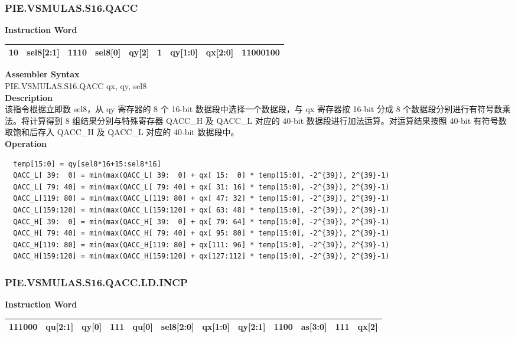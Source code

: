 \newpage
\subsubsection{PIE.VSMULAS.S16.QACC}\label{instruction:PIEVSMULASS16QACC}
\setlength\tabcolsep{6pt}
\textbf{Instruction Word} \\
\begin{tabular}{|c|c|c|c|c|c|c|c|c|}
	\hline
	10 & sel8[2:1] & 1110 & sel8[0] & qy[2] & 1 & qy[1:0] & qx[2:0] & 11000100 \\
	\hline
\end{tabular}

\textbf{Assembler Syntax} \\
PIE.VSMULAS.S16.QACC qx, qy, sel8 \\
\textbf{Description} \\
该指令根据立即数 sel8，从 qy 寄存器的 8 个 16-bit 数据段中选择一个数据段，与 qx 寄存器按 16-bit 分成 8 个数据段分别进行有符号数乘法。将计算得到 8 组结果分别与特殊寄存器 QACC\_H 及 QACC\_L 对应的 40-bit 数据段进行加法运算。对运算结果按照 40-bit 有符号数取饱和后存入 QACC\_H 及 QACC\_L 对应的 40-bit 数据段中。\\
\textbf{Operation}
\begin{lstlisting}
  temp[15:0] = qy[sel8*16+15:sel8*16]
  QACC_L[ 39:  0] = min(max(QACC_L[ 39:  0] + qx[ 15:  0] * temp[15:0], -2^{39}), 2^{39}-1)
  QACC_L[ 79: 40] = min(max(QACC_L[ 79: 40] + qx[ 31: 16] * temp[15:0], -2^{39}), 2^{39}-1)
  QACC_L[119: 80] = min(max(QACC_L[119: 80] + qx[ 47: 32] * temp[15:0], -2^{39}), 2^{39}-1)
  QACC_L[159:120] = min(max(QACC_L[159:120] + qx[ 63: 48] * temp[15:0], -2^{39}), 2^{39}-1)
  QACC_H[ 39:  0] = min(max(QACC_H[ 39:  0] + qx[ 79: 64] * temp[15:0], -2^{39}), 2^{39}-1)
  QACC_H[ 79: 40] = min(max(QACC_H[ 79: 40] + qx[ 95: 80] * temp[15:0], -2^{39}), 2^{39}-1)
  QACC_H[119: 80] = min(max(QACC_H[119: 80] + qx[111: 96] * temp[15:0], -2^{39}), 2^{39}-1)
  QACC_H[159:120] = min(max(QACC_H[159:120] + qx[127:112] * temp[15:0], -2^{39}), 2^{39}-1)
\end{lstlisting}

\newpage
\subsubsection{PIE.VSMULAS.S16.QACC.LD.INCP}\label{instruction:PIEVSMULASS16QACCLDINCP}
\setlength\tabcolsep{6pt}
\textbf{Instruction Word} \\
\begin{tabular}{|c|c|c|c|c|c|c|c|c|c|c|c|}
	\hline
	111000 & qu[2:1] & qy[0] & 111 & qu[0] & sel8[2:0] & qx[1:0] & qy[2:1] & 1100 & as[3:0] & 111 & qx[2] \\
	\hline
\end{tabular}

